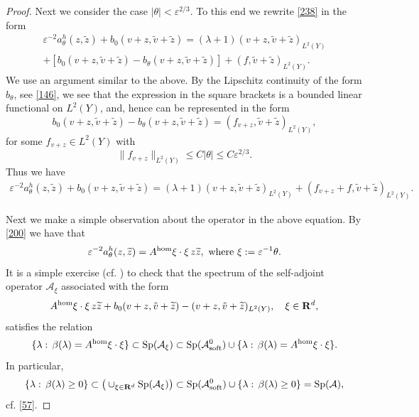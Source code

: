 \documentclass[11pt]{article}
\newcommand\e {\varepsilon}
\newcommand\soft{{\rm soft}}
\newcommand{\R}{\mathbf{R}}
\def\AA{\mathcal{A}}
\def\l{\lambda}
\def\hom{{\rm hom}}
\DeclareMathOperator{\Sp}{Sp}
\theoremstyle{remark}
\begin{document}
\begin{proof}
	Next we consider the case $|\theta |< \e^{2/3}$. To this end we rewrite \eqref{238} in the form
	\begin{multline}\label{244}
		\e^{-2} a_\theta^h(z, \widetilde z) + b_0(v + z, \tilde v+ \widetilde z) =
		(\l +1)(v + z,\tilde v + \widetilde z)_{L^2(Y)}
		\\
		+[b_0(v + z, \tilde v+ \widetilde z) - b_\theta(v + z, \tilde v+ \widetilde z)] + (f,\tilde v  + \widetilde z)_{L^2(Y)}.
	\end{multline}
	We use an argument similar to the above. By the Lipschitz continuity of the form $b_\theta$, see \eqref{146}, we see that the expression in the square brackets is a bounded linear functional on ${L^2(Y)}$, and, hence can be represented in the form
	\begin{equation}\label{248}
		b_0(v + z, \tilde v+ \widetilde z) - b_\theta(v + z, \tilde v+ \widetilde z) = ( f_{v+z},\tilde v  + \widetilde z)_{L^2(Y)},
	\end{equation}
	for some $f_{v+z} \in L^2(Y)$  with
 \begin{equation}\label{246}
      \| f_{v+z}\|_{L^2(Y)}\leq C |\theta| \leq  C  \e^{2/3}.
 \end{equation}
 Thus we have
	\begin{multline}\label{245}
		\e^{-2} a_\theta^h(z, \widetilde z) + b_0(v + z, \tilde v+ \widetilde z) =
		(\l +1)(v + z,\tilde v + \widetilde z)_{L^2(Y)}
		+ ( f_{v+z} + f,\tilde v  + \widetilde z)_{L^2(Y)}.
	\end{multline}
	
	
	Next we make a  simple observation about the operator in the above equation.  By \eqref{200} we have that
	\begin{equation*}%
		\e^{-2} a_\theta^h(z,\widetilde z) = A^\hom \xi \cdot \xi \, z \widetilde z, \mbox{ where } \xi : = \e^{-1} \theta.
	\end{equation*}
	It is a simple exercise (cf. \cite{Zhikov2000}) to check that the  spectrum of the self-adjoint operator $\AA_\xi$ associated with the form
	\begin{equation*}%
		A^\hom \xi \cdot \xi \, z \widetilde z + b_0(v + z, \tilde v+ \widetilde z) - (v+z,\tilde v  + \widetilde z)_{L^2(Y)}, \quad \xi \in \R^d,
	\end{equation*}
	satisfies the relation
 \begin{equation}\label{250}
	\{ \l : \, \beta(\l) = A^\hom \xi \cdot \xi \}\subset	\Sp(\AA_\xi) \subset   \Sp(\AA_\soft^0) \cup \{ \l : \, \beta(\l) = A^\hom \xi \cdot \xi \}.
	\end{equation}
	In particular,
	\begin{equation*}
	\{ \l : \, \beta(\l) \geq 0 \} \subset	\big(\cup_{\xi \in \R^d} \Sp(\AA_\xi)\big)\subset \Sp(\AA_\soft^0) \cup \{ \l : \, \beta(\l) \geq 0 \}  = \Sp(\AA),
	\end{equation*}
	cf. \eqref{57}.
	

\end{proof}
\end{document}
